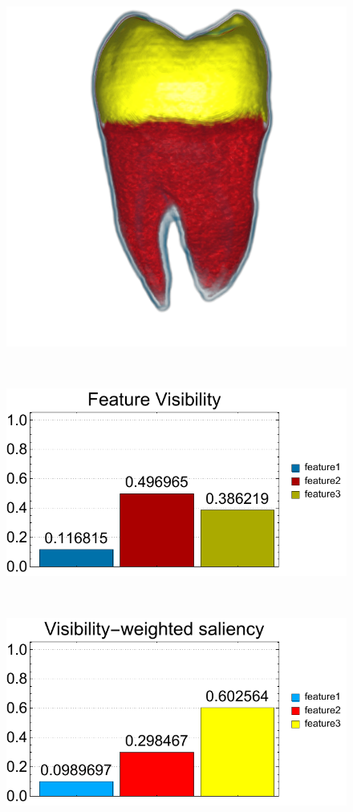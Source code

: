 \begin{figure}
	\centering
	\begin{minipage}{.24\textwidth}
		\includegraphics[width=1\linewidth]{images/tooth_naive_optimized_linesearch}
		\subcaption{}
	\end{minipage}~
	\begin{minipage}{.24\textwidth}
		\includegraphics[width=1\linewidth]{figures/tooth_naive_optimized_linesearch_visibility_chart}
		\subcaption{}
	\end{minipage}~
	\begin{minipage}{.24\textwidth}
		\includegraphics[width=1\linewidth]{figures/tooth_naive_optimized_linesearch_visibility_saliency_weighted_chart}

\end{minipage}
\end{figure}
